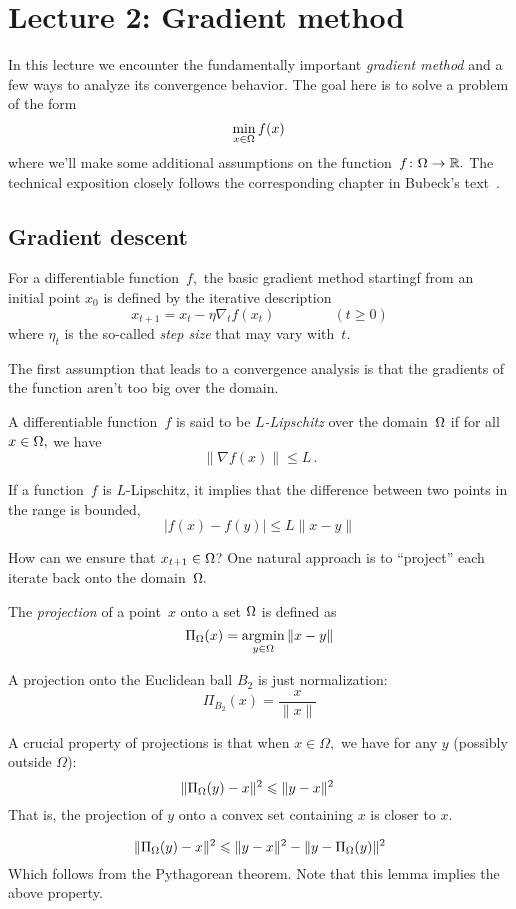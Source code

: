 \section{Lecture 2: Gradient method}

In this lecture we encounter the fundamentally important \emph{gradient method}
and a few ways to analyze its convergence behavior.
The goal here is to solve a problem of the form
\[
\min_{x\in\Omega} f(x)\,
\]
where we'll make some additional assumptions on the
function~$f\colon\Omega\to\mathbb{R}.$ The technical exposition closely follows the
corresponding chapter in Bubeck's text~\cite{Bubeck}.

\subsection{Gradient descent}

For a differentiable function~$f,$ the basic gradient method startingf from an
initial point $x_0$ is defined by the iterative description
\[
x_{t+1} = x_t - \eta \nabla_t f(x_t)\,\qquad\qquad(t\ge 0)
\]
where $\eta_t$ is the so-called \emph{step size} that may vary with~$t.$

The first assumption that leads to a convergence analysis is that the gradients
of the function aren't too big over the domain.

\begin{definition}[$L$-Lipschitz]
A differentiable function~$f$ is said to be \emph{$L$-Lipschitz} over the
domain~$\Omega$ if for all~$x\in\Omega,$ we have
\[
\|\nabla f(x)\| \leq L\,.
\]
\end{definition}

\begin{fact}
If a function~$f$ is $L$-Lipschitz, it implies that the difference between two points in the range is bounded,
\[
|f(x) - f(y)| \leq L \|x - y\|
\]
\end{fact}

How can we ensure that $x_{t+1}\in\Omega$?  One natural approach is to
``project'' each iterate back onto the domain~$\Omega.$

\begin{definition}[Projection]
The \emph{projection} of a point~$x$ onto a set $\Omega$ is defined as
\[
\Pi_{\Omega}(x) = \operatorname*{\arg\!\min}_{y\in\Omega} \|x-y\|
\]
\end{definition}

\begin{example}
A projection onto the Euclidean ball $B_2$ is just normalization:
\[
\Pi_{B_2}(x) = \dfrac{x}{\|x\|}
\]
\end{example}
%
A crucial property of projections is that when $x\in\Omega,$ we have for any $y$
(possibly outside $\Omega$):
\[
\| \Pi_{\Omega}(y) - x \|^2 \leqslant \| y - x \|^2\
\]
That is, the projection of $y$ onto a convex set containing $x$ is closer to $x$. 
%
\begin{lemma}
\[
\| \Pi_{\Omega}(y) - x \|^2 \leqslant \| y - x \|^2 - \| y - \Pi_{\Omega}(y) \|^2
\]
Which follows from the Pythagorean theorem. Note that this lemma implies the above property.
\end{lemma}

